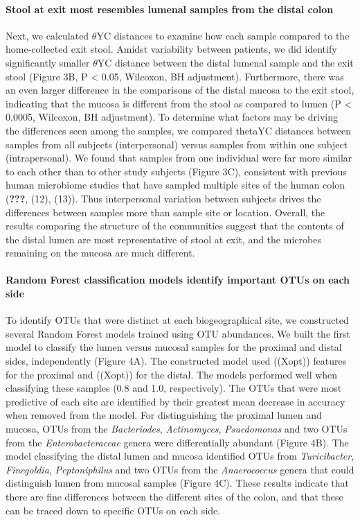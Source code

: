 \documentclass[11pt,]{article}
\let\oldparagraph\paragraph
\renewcommand{\paragraph}[1]{\oldparagraph{#1}\mbox{}}
\begin{document}
\paragraph{Stool at exit most resembles lumenal samples from the distal
colon}\label{stool-at-exit-most-resembles-lumenal-samples-from-the-distal-colon}

Next, we calculated \({\theta}\)YC distances to examine how each sample
compared to the home-collected exit stool. Amidst variability between
patients, we did identify significantly smaller \({\theta}\)YC distance
between the distal lumenal sample and the exit stool (Figure 3B, P
\textless{} 0.05, Wilcoxon, BH adjustment). Furthermore, there was an
even larger difference in the comparisons of the distal mucosa to the
exit stool, indicating that the mucosa is different from the stool as
compared to lumen (P \textless{} 0.0005, Wilcoxon, BH adjustment). To
determine what factors may be driving the differences seen among the
samples, we compared thetaYC distances between samples from all subjects
(interpersonal) versus samples from within one subject (intrapersonal).
We found that samples from one individual were far more similar to each
other than to other study subjects (Figure 3C), consistent with previous
human microbiome studies that have sampled multiple sites of the human
colon (\textbf{???}, (12), (13)). Thus interpersonal variation between
subjects drives the differences between samples more than sample site or
location. Overall, the results comparing the structure of the
communities suggest that the contents of the distal lumen are most
representative of stool at exit, and the microbes remaining on the
mucosa are much different.

\paragraph{Random Forest classification models identify important OTUs
on each
side}\label{random-forest-classification-models-identify-important-otus-on-each-side}

To identify OTUs that were distinct at each biogeographical site, we
constructed several Random Forest models trained using OTU abundances.
We built the first model to classify the lumen versus mucosal samples
for the proximal and distal sides, independently (Figure 4A). The
constructed model used ((Xopt)) features for the proximal and ((Xopt))
for the distal. The models performed well when classifying these samples
(0.8 and 1.0, respectively). The OTUs that were most predictive of each
site are identified by their greatest mean decrease in accuracy when
removed from the model. For distinguishing the proximal lumen and
mucosa, OTUs from the \emph{Bacteriodes}, \emph{Actinomyces},
\emph{Psuedomonas} and two OTUs from the \emph{Enterobacteraceae} genera
were differentially abundant (Figure 4B). The model classifying the
distal lumen and mucosa identified OTUs from \emph{Turicibacter},
\emph{Finegoldia}, \emph{Peptoniphilus} and two OTUs from the
\emph{Anaerococcus} genera that could distinguish lumen from mucosal
samples (Figure 4C). These results indicate that there are fine
differences between the different sites of the colon, and that these can
be traced down to specific OTUs on each side.
\end{document}
